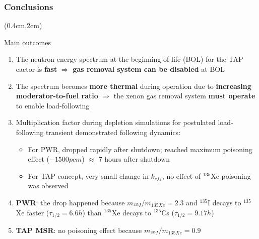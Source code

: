\begin{frame}
\frametitle{Conclusions}
	\begin{textblock*}{12cm}(0.4cm,2cm) %
	\begin{block}{Main outcomes}
		\begin{enumerate}
			\itemsep=3mm
			\item The neutron energy spectrum at the beginning-of-life 
			(BOL) for the \gls{TAP} eactor is \textbf{fast} $\Rightarrow$ 
			\textbf{gas removal system can be disabled} at \gls{BOL}
			\item The spectrum becomes \textbf{more thermal} during operation 
			due to \textbf{increasing moderator-to-fuel ratio} $\Rightarrow$ 
			the xenon gas removal system \textbf{must operate} to enable 
			load-following

			\item Multiplication factor during depletion simulations for 
			postulated load-following transient demonstrated following 
			dynamics:
				\begin{itemize}
					\item For PWR, dropped rapidly after shutdown; reached 
					maximum poisoning effect ($-1500pcm$) $\approx$ 7 hours 
					after shutdown
					\item For \gls{TAP} concept, very small change in 
					$k_{eff}$, no effect of $^{135}$Xe poisoning was observed
				\end{itemize}
			\item \textbf{PWR}: the drop happened because 			
			$m_{^{135}I}/m_{{135}Xe} = 2.3$ and $^{135}$I decays to $^{135}$Xe 
			faster ($\tau_{1/2}=6.6h$) than $^{135}$Xe decays to $^{135}$Cs 
			($\tau_{1/2}=9.17h$)
			\item \textbf{\gls{TAP} \gls{MSR}}: no poisoning effect because 
			$m_{^{135}I}/m_{{135}Xe} = 0.9$
		\end{enumerate}
	\end{block}


	\end{textblock*}
\end{frame}

